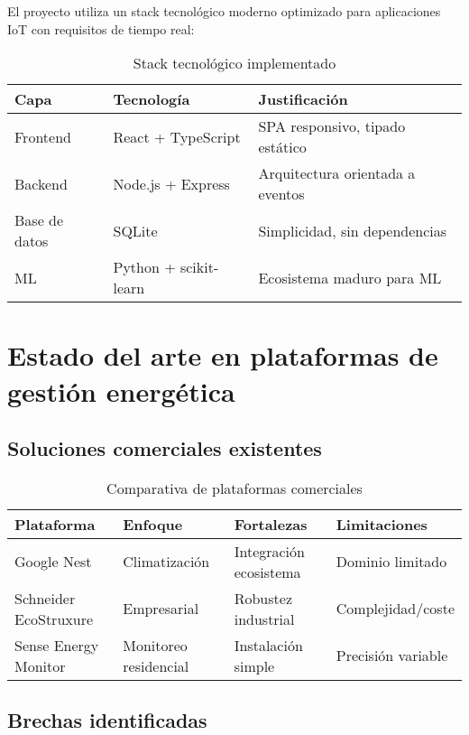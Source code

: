 El proyecto utiliza un stack tecnológico moderno optimizado para aplicaciones IoT con requisitos de tiempo real:

\begin{table}[H]
\centering
\caption{Stack tecnológico implementado}
\begin{tabular}{|l|l|l|}
\hline
\textbf{Capa} & \textbf{Tecnología} & \textbf{Justificación} \\
\hline
Frontend & React + TypeScript & SPA responsivo, tipado estático \\
\hline
Backend & Node.js + Express & Arquitectura orientada a eventos \\
\hline
Base de datos & SQLite & Simplicidad, sin dependencias \\
\hline
ML & Python + scikit-learn & Ecosistema maduro para ML \\
\hline
\end{tabular}
\label{tab:stack_tecnologico}
\end{table}

\section{Estado del arte en plataformas de gestión energética}

\subsection{Soluciones comerciales existentes}

\begin{table}[H]
\centering
\caption{Comparativa de plataformas comerciales}
\begin{tabular}{|l|l|l|l|}
\hline
\textbf{Plataforma} & \textbf{Enfoque} & \textbf{Fortalezas} & \textbf{Limitaciones} \\
\hline
Google Nest & Climatización & Integración ecosistema & Dominio limitado \\
\hline
Schneider EcoStruxure & Empresarial & Robustez industrial & Complejidad/coste \\
\hline
Sense Energy Monitor & Monitoreo residencial & Instalación simple & Precisión variable \\
\hline
\end{tabular}
\label{tab:plataformas_comerciales}
\end{table}

\subsection{Brechas identificadas}

